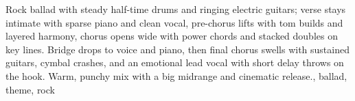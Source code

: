 

\begin{notes}
\end{notes}
\begin{style}
Rock ballad with steady half-time drums and ringing electric guitars; verse stays intimate with sparse piano and clean vocal, pre-chorus lifts with tom builds and layered harmony, chorus opens wide with power chords and stacked doubles on key lines. %
Bridge drops to voice and piano, then final chorus swells with sustained guitars, cymbal crashes, and an emotional lead vocal with short delay throws on the hook. %
Warm, punchy mix with a big midrange and cinematic release., ballad, theme, rock
\end{style}
